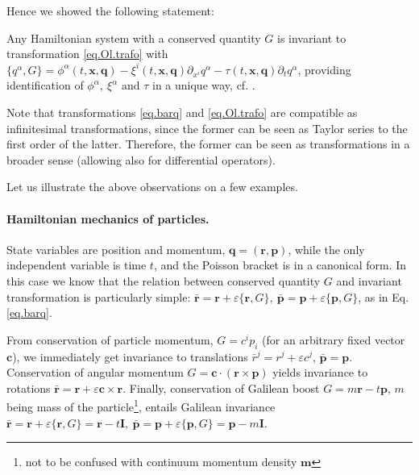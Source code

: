 \documentclass[
10pt, %
a4paper, %
oneside, %
headinclude,footinclude, %
BCOR5mm, %
]{scrartcl}
\newcommand{\xx}{\mathbf{x}}
\newcommand{\Id}{\mathbf{I}}
\newcommand{\mm}{\mathbf{m}}
\newcommand{\qq}{\mathbf{q}}
\newcommand{\rr}{\mathbf{r}}
\newcommand{\cc}{\mathbf{c}}
\newcommand{\pp}{\mathbf{p}}
\newcommand{\MP}[1]{{\color{OliveGreen}MP:\ \ #1}}
\newcommand{\IP}[1]{{\color{Red}IP:\ \ #1}}
\newcommand{\Gfunc}{G}
\begin{document}
Hence we showed the following statement:
\begin{theorem}
	Any Hamiltonian system with a conserved quantity $\Gfunc$ is invariant to 
	transformation \eqref{eq.Ol.trafo}
with $\{q^\alpha,\Gfunc\}= \phi^\alpha(t,\mathbf{x},\mathbf{q}) - 
\xi^i(t,\mathbf{x},\mathbf{q}) \partial_{x^i} q^\alpha - 
\tau(t,\mathbf{x},\mathbf{q}) \partial_t q^\alpha$, providing identification of 
$\phi^\alpha,~\xi^\alpha$ and $\tau$ in a unique way, cf. \cite{olver2000applications}.
\end{theorem}

Note that transformations \eqref{eq.barq} and \eqref{eq.Ol.trafo} are 
compatible as infinitesimal transformations, since the former can be seen as 
Taylor series to the first order of the latter. Therefore, the former can be 
seen as transformations in a broader sense (allowing also for differential 
operators).

Let us illustrate the above observations on a few examples.

\paragraph{Hamiltonian mechanics of particles.} State variables are position 
and 
momentum, $\qq=(\rr,\pp)$, while the only independent variable is time $t$, and 
the Poisson bracket is in a canonical form. In this case we know that the 
relation between conserved quantity $\Gfunc$ and invariant transformation is 
particularly simple: $\bar{\rr} = \rr + \varepsilon \{\rr,\Gfunc\},~ \bar{\pp} 
= 
\pp + \varepsilon \{\pp,\Gfunc\}$, as in Eq. \eqref{eq.barq}.

From conservation of particle momentum, $\Gfunc=c^i p_i$ (for an arbitrary fixed vector $\cc$), we 
immediately get 
invariance to translations $\bar{r}^j = r^j + \varepsilon c^j$, 
$\bar{\pp} = 
\pp$. Conservation of 
angular momentum $\Gfunc = \cc \cdot (\rr\times \pp)$ 
yields invariance to rotations $\bar{\rr} = \rr + \varepsilon \cc \times \rr$. 
Finally, conservation of Galilean boost $\Gfunc = m \mathbf{r} - t \mathbf{p}$, $m$ being mass of the particle\footnote{not to be confused with continuum momentum density $\mm$},
entails Galilean invariance $\bar{\rr} = \rr + \varepsilon \{\rr,\Gfunc\}= \rr 
- t 
\Id ,~ \bar{\pp} = \pp + \varepsilon \{\pp,\Gfunc\} = \pp - m\Id$.
\end{document}

